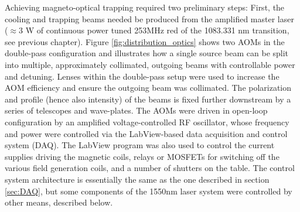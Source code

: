 	Achieving magneto-optical trapping required two preliminary steps: First, the cooling and trapping beams needed be produced from the amplified master laser ($\approx$3 W of continuous power tuned 253MHz red of the 1083.331 nm transition, see previous chapter).
	Figure \ref{fig:distribution_optics} shows two AOMs in the double-pass configuration and illustrates how a single source beam can be split into multiple, approximately collimated, outgoing beams with controllable power and detuning.
	Lenses within the double-pass setup were used to increase the AOM efficiency and ensure the outgoing beam was collimated.
	The polarization and profile (hence also intensity) of the beams is fixed further downstream by a series of telescopes and wave-plates.
	The AOMs were driven in open-loop configuration by an amplified voltage-controlled RF oscillator, whose frequency and power were controlled via the LabView-based data acquisition and control system (DAQ).
	The LabView program was also used to control the current supplies driving the magnetic coils, relays or MOSFETs for switching off the various field generation coils, and a number of shutters on the table.
	The control system architecture is essentially the same as the one described in section \ref{sec:DAQ}, but some components of the 1550nm laser system were controlled by other means, described below.
	
